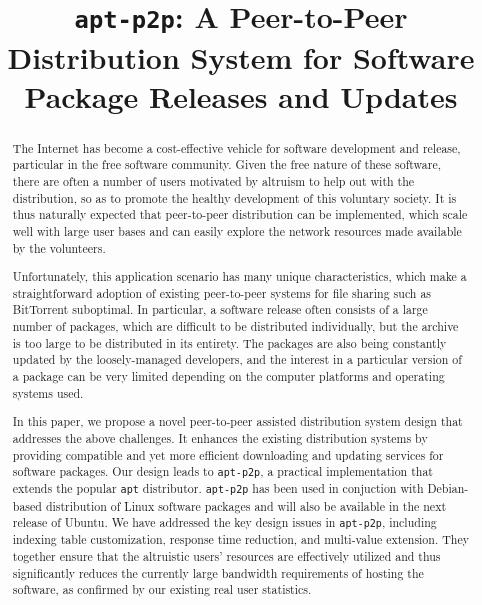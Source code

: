 \documentclass[conference]{IEEEtran}
\begin{document}
\title{\texttt{apt-p2p}: A Peer-to-Peer Distribution System for Software Package Releases and Updates}
\author{
\and
{}
}

\maketitle

\begin{abstract}
The Internet has become a cost-effective
vehicle for software development and release, particular in the free software community.
Given the free nature of these software, there are often a number of users
motivated by altruism to help out with the distribution, so as to promote the healthy development
of this voluntary society. It is thus naturally expected that peer-to-peer distribution can be implemented,
which scale well with large user bases and can easily explore the network resources made available by
the volunteers.

Unfortunately, this application scenario has many unique characteristics, which
make a straightforward adoption of existing peer-to-peer systems for file sharing such as BitTorrent suboptimal. In particular,
a software release often consists of a large number of packages, which are difficult to be distributed individually, but the archive is
too large to be distributed in its entirety. The packages are also being constantly
updated by the loosely-managed developers, and the interest in a particular version of a package can be very
limited depending on the computer platforms and operating systems used.

In this paper, we propose a novel peer-to-peer assisted distribution system design that
addresses the above challenges. It enhances the existing distribution systems by providing compatible and yet more efficient downloading and updating services
for software packages. Our design leads to \texttt{apt-p2p}, a practical implementation that extends the popular \texttt{apt} distributor.  \texttt{apt-p2p}  has been used in conjuction with Debian-based distribution of Linux
software packages and will also be available in the next release of Ubuntu. We have addressed the key design issues in \texttt{apt-p2p}, including indexing table customization,
response time reduction, and multi-value extension. They together ensure
that the altruistic users' resources are effectively utilized and thus significantly reduces the currently
large bandwidth requirements of hosting the software, as confirmed by our existing real user statistics.
\end{abstract}
\end{document}
